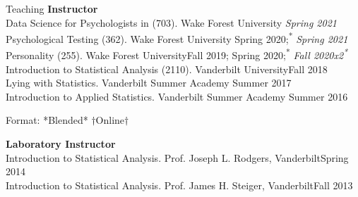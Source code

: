 \begin{rSection}{\textrm{Teaching}}
\vspace*{2pt}
{\large {\bf Instructor}\\}
Data Science for Psychologists in \R (703). Wake Forest University \hfill {\textit{Spring 2021}}\smallskip\\
Psychological Testing  (362). Wake Forest University \hfill {Spring 2020;\textsuperscript{*} \textit{Spring 2021}}\smallskip\\%
Personality (255). Wake Forest University\hfill{Fall 2019; Spring 2020;\textsuperscript{*} \textit{Fall 2020x2\textsuperscript{*}\noteBns}}\smallskip\\
Introduction to Statistical Analysis (2110). Vanderbilt University\hfill {Fall 2018}\smallskip\\
Lying with Statistics. Vanderbilt Summer Academy \hfill{Summer 2017}\smallskip\\
Introduction to Applied Statistics. Vanderbilt Summer Academy \hfill{Summer 2016}%
\vspace{-2mm}\begin{center}\footnotesize{Format: *Blended* $\dagger$Online$\dagger$}\end{center}%
\begin{minipage}{\linewidth}
{\large {\bf Laboratory Instructor}}\\
Introduction to Statistical Analysis. Prof. Joseph L. Rodgers, Vanderbilt\hfill{Spring 2014}%
\smallskip\\
Introduction to Statistical Analysis. Prof. James H. Steiger, Vanderbilt\hfill{Fall 2013}%

\end{minipage}
\end{rSection}
